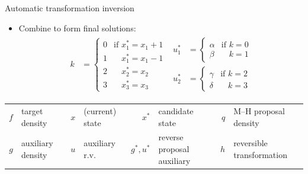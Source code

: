 \documentclass[final]{beamer}
\newlength{\colwidth}
\begin{document}
\begin{frame}[t]
\begin{columns}[t]
\begin{column}{\colwidth}
\begin{block}{Automatic transformation inversion}
\begin{itemize}
\begin{itemize}
                  \item Combine to form final solutions:
                        \begin{align*}
                          \begin{split}
                            k & =\begin{cases}
                              0 & \text{if }x^*_1 = x_1 + 1           \\
                              1 & \phantom{\text{if }}x^*_1 = x_1 - 1 \\
                              2 & \phantom{\text{if }}x^*_2 = x_2     \\
                              3 & \phantom{\text{if }}x^*_3 = x_3
                            \end{cases}
                          \end{split}
                          \begin{split}
                            u_{1}^{*} & =\begin{cases}
                              \alpha & \text{if }k = 0           \\
                              \beta  & \phantom{\text{if }}k = 1
                            \end{cases} \\
                            u_{2}^{*} & =\begin{cases}
                              \gamma & \text{if }k = 2           \\
                              \delta & \phantom{\text{if }}k = 3
                            \end{cases}
                          \end{split}
                        \end{align*}
                \end{itemize}
        \end{itemize}

        {\footnotesize
          \begin{tabular}{rlrlrlrl}
            $f$ & target density    & $x$ & (current) state & $x^*$     & candidate state            & $q$ & M--H proposal density     \\
            $g$ & auxiliary density & $u$ & auxiliary r.v.  & $g^*,u^*$ & reverse proposal auxiliary & $h$ & reversible transformation
          \end{tabular}
        }


\end{block}
\end{column}
\end{columns}
\end{frame}
\end{document}
